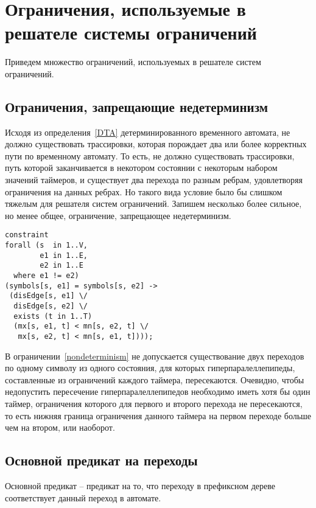 \documentclass[times,specification,annotation]{itmo-student-thesis}
\begin{document}
\section{Ограничения, используемые в решателе системы ограничений}

Приведем множество ограничений, используемых в решателе систем ограничений.

\subsection{Ограничения, запрещающие недетерминизм}

Исходя из определения~\ref{DTA} детерминированного временного автомата, не должно существовать трассировки, которая порождает два или более корректных пути по временному автомату.
То есть, не должно существовать трассировки, путь которой заканчивается в некотором состоянии с некоторым набором значений таймеров, и существует два перехода по разным ребрам,
удовлетворяя ограничения на данных ребрах. Но такого вида условие было бы слишком тяжелым для решателя систем ограничений. Запишем несколько более сильное, но менее общее, ограничение, запрещающее
недетерминизм.

\begin{lstlisting}[float=!h,language=Mzn,caption={Ограничение, запрещающее недетерминизм},label={nondeterminism}]
constraint
forall (s  in 1..V,
        e1 in 1..E,
        e2 in 1..E
  where e1 != e2)
(symbols[s, e1] = symbols[s, e2] -> 
 (disEdge[s, e1] \/
  disEdge[s, e2] \/
  exists (t in 1..T) 
  (mx[s, e1, t] < mn[s, e2, t] \/ 
   mx[s, e2, t] < mn[s, e1, t])));
\end{lstlisting}

В ограничении~\ref{nondeterminism} не допускается существование двух переходов по одному символу из одного состояния, для которых гиперпаралеллепипеды, составленные из ограничений каждого таймера,
пересекаются. Очевидно, чтобы недопустить пересечение гиперпаралеллепипедов необходимо иметь хотя бы один таймер, ограничения которого для первого и второго перехода не пересекаются, то есть
нижняя граница ограничения данного таймера на первом переходе больше чем на втором, или наоборот.

\subsection{Основной предикат на переходы}

Основной предикат -- предикат на то, что переходу в префиксном дереве соответствует данный переход в автомате.
\end{document}
